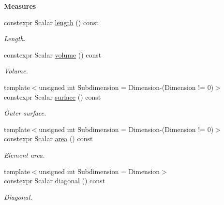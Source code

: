 \begin{Indent}{\bf Measures}\par
\begin{DoxyCompactItemize}
\item 
constexpr Scalar \hyperlink{classmagrathea_1_1AbstractHyperCube_a8534fd1643ba9e27a45a10a9526fc26e}{length} () const 
\begin{DoxyCompactList}\small\item\em Length. \end{DoxyCompactList}\item 
constexpr Scalar \hyperlink{classmagrathea_1_1AbstractHyperCube_a4f80c91ff6729500b69edc88107791aa}{volume} () const 
\begin{DoxyCompactList}\small\item\em Volume. \end{DoxyCompactList}\item 
{\footnotesize template$<$unsigned int Subdimension = Dimension-\/(\-Dimension != 0)$>$ }\\constexpr Scalar \hyperlink{classmagrathea_1_1AbstractHyperCube_ad4b1dded1b858ea3483e5af1113ed57e}{surface} () const 
\begin{DoxyCompactList}\small\item\em Outer surface. \end{DoxyCompactList}\item 
{\footnotesize template$<$unsigned int Subdimension = Dimension-\/(\-Dimension != 0)$>$ }\\constexpr Scalar \hyperlink{classmagrathea_1_1AbstractHyperCube_aa65ddc7ef856434b45aecff688390d4b}{area} () const 
\begin{DoxyCompactList}\small\item\em Element area. \end{DoxyCompactList}\item 
{\footnotesize template$<$unsigned int Subdimension = Dimension$>$ }\\constexpr Scalar \hyperlink{classmagrathea_1_1AbstractHyperCube_a698ec7f90b98f44f8149da7ad466419a}{diagonal} () const 
\begin{DoxyCompactList}\small\item\em Diagonal. \end{DoxyCompactList}\end{DoxyCompactItemize}
\end{Indent}
